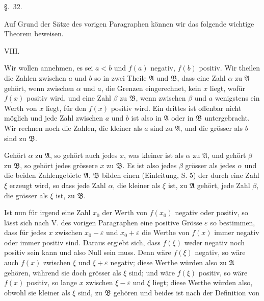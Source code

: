 
\begin{center}
{\large \S.\ 32.}

\vspace{0.5em}
{\large{}}
\end{center}

Auf Grund der Sätze des vorigen Paragraphen können wir das folgende wichtige Theorem beweisen.

\medskip
\noindent VIII. 
\medskip

Wir wollen annehmen, es sei $a<b$ und $f(a)$ negativ, $f(b)$ positiv. Wir theilen die Zahlen zwischen $a$ und $b$ so in zwei Theile $\mathfrak A$ und $\mathfrak B$, dass eine Zahl $\alpha$ zu $\mathfrak A$ gehört, wenn zwischen $\alpha$ und $a$, die Grenzen eingerechnet, kein $x$ liegt, wofür $f(x)$ positiv wird, und eine Zahl $\beta$ zu $\mathfrak B$, wenn zwischen $\beta$ und $a$ wenigstens ein Werth von $x$ liegt, für den $f(x)$ positiv wird. Ein drittes ist offenbar nicht möglich und jede Zahl zwischen $a$ und $b$ ist also in $\mathfrak A$ oder in $\mathfrak B$ untergebracht. Wir rechnen noch die Zahlen, die kleiner als $a$ sind zu $\mathfrak A$, und die grösser als $b$ sind zu $\mathfrak B$.

Gehört $\alpha$ zu $\mathfrak A$, so gehört auch jedes $x$, was kleiner ist als $\alpha$ zu $\mathfrak A$, und gehört $\beta$ zu $\mathfrak B$, so gehört jedes grössere $x$ zu $\mathfrak B$. Es ist also jedes $\beta$ grösser als jedes $\alpha$ und die beiden Zahlengebiete $\mathfrak A$, $\mathfrak B$ bilden einen  (Einleitung, S. 5) der durch eine Zahl $\xi$ erzeugt wird, so dass jede Zahl $\alpha$, die kleiner als $\xi$ ist, zu $\mathfrak A$ gehört, jede Zahl $\beta$, die grösser als $\xi$ ist, zu $\mathfrak B$.

Ist nun für irgend eine Zahl $x_0$ der Werth von $f(x_0)$ negativ oder positiv, so lässt sich nach V. des vorigen Paragraphen eine positive Grösse $\varepsilon$ so bestimmen, dass für jedes $x$ zwischen $x_0-\varepsilon$ und $x_0+\varepsilon$ die Werthe von $f(x)$ immer negativ oder immer positiv sind. Daraus ergiebt sich, dass $f(\xi)$ weder negativ noch positiv sein kann und also Null sein muss. Denn wäre $f(\xi)$ negativ, so wäre auch $f(x)$ zwischen $\xi$ und $\xi+\varepsilon$ negativ; diese Werthe würden also zu $\mathfrak A$ gehören, während sie doch grösser als $\xi$ sind; und wäre $f(\xi)$ positiv, so wäre $f(x)$ positiv, so lange $x$ zwischen $\xi-\varepsilon$ und $\xi$ liegt; diese Werthe würden also, obwohl sie kleiner als $\xi$ sind, zu $\mathfrak B$ gehören und beides ist nach der Definition von
